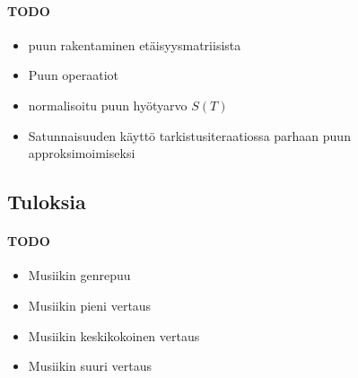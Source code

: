 \documentclass[12pt,finnish]{tktltiki2}
\theoremstyle{definition}
\theoremstyle{remark}
\begin{document}

  \paragraph{TODO} %
    \begin{itemize}
      \item puun rakentaminen etäisyysmatriisista
      \item Puun operaatiot
      \item normalisoitu puun hyötyarvo $S(T)$
      \item Satunnaisuuden käyttö tarkistusiteraatiossa parhaan puun approksimoimiseksi
    \end{itemize}
    \subsection{Tuloksia} %
    \label{sub:tuloksia}
      \paragraph{TODO} %
      \begin{itemize}
        \item Musiikin genrepuu
        \item Musiikin pieni vertaus
        \item Musiikin keskikokoinen vertaus
        \item Musiikin suuri vertaus
      \end{itemize}

\end{document}
